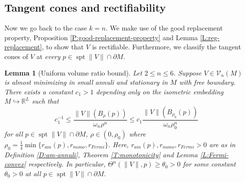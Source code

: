 \documentclass[10pt]{amsart}
\newtheorem{lemma}[theorem]{Lemma}
\theoremstyle{definition}
\theoremstyle{remark}
\numberwithin{equation}{section}
\newcommand{\V}{\mathcal{V}}
\newcommand{\R}{\mathbb{R}}
\newcommand{\spt}{\operatorname{spt}}
\begin{document}
\subsection{Tangent cones and rectifiability}
\label{SS:tangent-cone}

Now we go back to the case $k=n$. We make use of the good replacement property, Proposition \ref{P:good-replacement-property} and Lemma \ref{L:reg-replacement}, to show that $V$ is rectifiable. Furthermore, we classify the tangent cones of $V$ at \emph{every} $p \in \spt \|V\| \cap \partial M$. 



\begin{lemma}[Uniform volume ratio bound]
\label{L:uniform-density-bdd}
Let $2 \leq n \leq 6$. Suppose $V \in \V_n(M)$ is almost minimizing in small annuli and stationary in $M$ with free boundary. There exists a constant $c_1>1$ depending only on the isometric embedding $M \hookrightarrow \R^L$ such that
\begin{equation}
\label{E:density-bdd}
c_1^{-1} \leq \frac{\|V\|(B_\rho(p))}{\omega_n \rho^n} \leq c_1  \frac{\|V\|(B_{\rho_0}(p))}{\omega_n \rho_0^n}
\end{equation}
for all $p \in \spt\|V\| \cap \partial M$, $\rho \in (0,\rho_0)$ where $\rho_0 = \frac{1}{4}\min\{r_{am}(p),r_{mono},r_{Fermi}\}$. Here, $r_{am}(p),r_{mono},r_{Fermi}>0$ are as in Definition \ref{D:am-annuli}, Theorem \ref{T:monotonicity} and Lemma \ref{L:Fermi-convex} respectively. In particular, $\Theta^n(\|V\|,p) \geq \theta_0>0$ for some constant $\theta_0>0$ at all $p \in \spt\|V\| \cap \partial M$.
\end{lemma}
\end{document}
